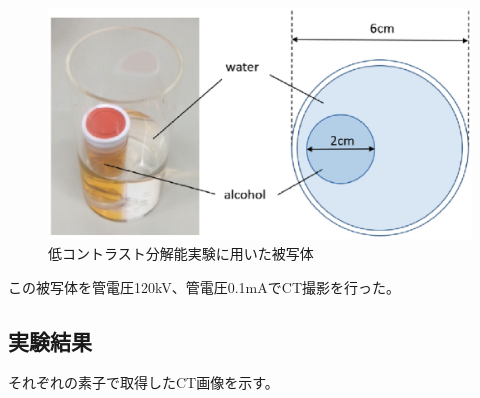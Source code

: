 \begin{figure}[H]
 \begin{center}
 \includegraphics[width=14cm]{image2/chapter5/phantom1.eps}
 \end{center}
 \caption{低コントラスト分解能実験に用いた被写体}
 \label{fig:phantom1}
\end{figure}

この被写体を管電圧120kV、管電圧0.1mAでCT撮影を行った。

\subsection{実験結果}

それぞれの素子で取得したCT画像を示す。


